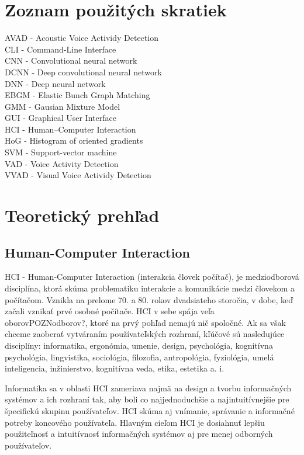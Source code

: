 \chapter{Zoznam použitých skratiek}

\begin{center}
AVAD - Acoustic Voice Actividy Detection\\
CLI - Command-Line Interface\\
CNN - Convolutional neural network\\
DCNN - Deep convolutional neural network\\
DNN - Deep neural network\\
EBGM  - Elastic Bunch Graph Matching\\
GMM - Gausian Mixture Model\\
GUI - Graphical User Interface\\
HCI  - Human–Computer Interaction\\
HoG - Histogram of oriented gradients\\
SVM - Support-vector machine\\
VAD - Voice Activity Detection\\
VVAD - Visual Voice Actividy Detection

\end{center}

\chapter{Teoretický prehľad}

\section{Human-Computer Interaction}
HCI - Human-Computer Interaction (interakcia človek počítač), je medziodborová disciplína, ktorá skúma problematiku interakcie a komunikácie medzi človekom a počítačom.
Vznikla na prelome 70. a 80. rokov dvadsiateho storočia, v dobe, keď začali vznikať prvé osobné počítače.
HCI v sebe spája veľa oborovPOZNodborov?, ktoré na prvý pohľad nemajú nič spoločné. 
Ak sa však chceme zaoberať vytváraním používateľských rozhraní, kľúčové sú nasledujúce disciplíny: informatika, ergonómia, umenie, design, psychológia, kognitívna psychológia, lingvistika, sociológia, filozofia, antropológia, fyziológia, umelá inteligencia, inžinierstvo, kognitívna veda, etika, estetika a. i.

Informatika sa v oblasti HCI zameriava najmä na design a tvorbu informačných systémov a ich rozhraní tak, aby boli co najjednoduchšie a najintuitívnejšie pre špecifickú skupinu používateľov.
HCI skúma aj vnímanie, správanie a informačné potreby koncového používateľa. 
Hlavným cieľom HCI je dosiahnuť lepšiu použiteľnosť a intuitívnosť informačných systémov aj pre menej odborných používateľov. \cite{HCI}

